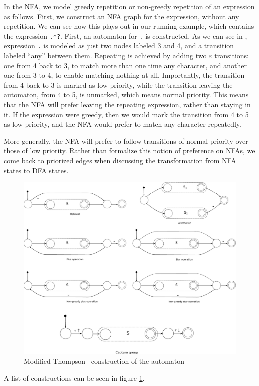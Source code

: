 \documentclass[english]{sigplanconf}
\begin{document}
In the NFA, we model greedy repetition or non-greedy repetition of
an expression as follows.  First, we construct an NFA graph for the
expression, without any repetition.  We can see how this plays out
in our running example, which contains the expression \texttt{.*?}.
First, an automaton for \texttt{.} is constructed.  As we can see
in , expression \texttt{.} is modeled as
just two nodes labeled 3 and 4, and a transition labeled ``any''
between them.  Repeating is achieved by adding two $\varepsilon$
transitions: one from 4 back to 3, to match more than one time any
character, and another one from 3 to 4, to enable matching nothing
at all.  Importantly, the transition from 4 back to 3 is marked as
low priority, while the transition leaving the automaton, from 4
to 5, is unmarked, which means normal priority.  This means that
the NFA will prefer leaving the repeating expression, rather than
staying in it.  If the expression were greedy, then we would mark
the transition from 4 to 5 as low-priority, and the NFA would prefer
to match any character repeatedly.

More generally, the NFA will prefer to follow transitions of normal
priority over those of low priority. Rather than formalize this
notion of preference on NFAs, we come back to priorized edges when
discussing the transformation from NFA states to DFA states.

\begin{figure}[tb]
\includegraphics[width=\linewidth]{graphs/thompson}
\caption{Modified Thompson~\cite{ThompsonRegex} construction of the automaton}
\label{fig:thompson-construction}
\end{figure}
A list of constructions can be seen in figure \ref{fig:thompson-construction}.
\end{document}
